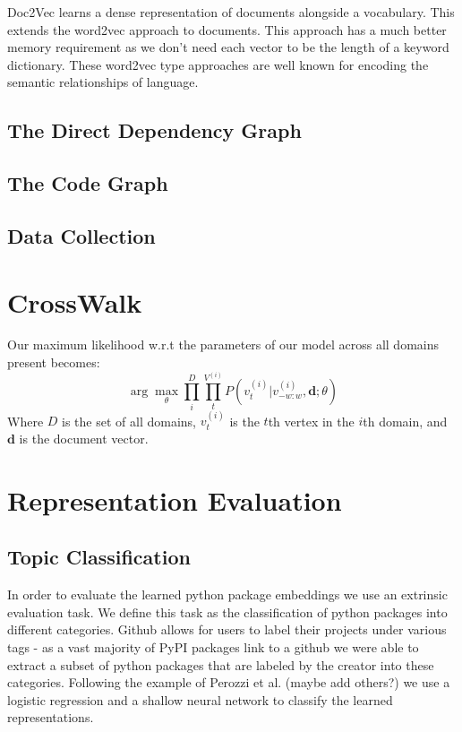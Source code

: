 \documentclass{article}
\begin{document}
 Doc2Vec \cite{doc2vec} learns a dense representation of documents alongside a vocabulary. This extends the word2vec \cite{word2vec} approach to documents. This approach has a much better memory requirement as we don’t need each vector to be the length of a keyword dictionary. These word2vec type approaches are well known for encoding the semantic relationships of language.

\subsection{The Direct Dependency Graph}

\subsection{The Code Graph}

\subsection{Data Collection}


\section{CrossWalk}
Our maximum likelihood w.r.t the parameters of our model across all domains present becomes:
\begin{equation}
\arg\max_{\theta} \prod_{i}^{D}\prod_{t}^{V^{(i)}}P(v^{(i)}_{t} | v^{(i)}_{-w:w}, \mathbf{d}; \theta)
\end{equation}
Where $D$ is the set of all domains, $v^{(i)}_{t}$ is the $t$th vertex in the $i$th domain, and $\mathbf{d}$ is the document vector.

\section{Representation Evaluation}

\subsection{Topic Classification}
In order to evaluate the learned python package embeddings we use an extrinsic evaluation task. We define this task as the classification of python packages into different categories. Github allows for users to label their projects under various tags - as a vast majority of PyPI packages link to a github we were able to extract a subset of python packages that are labeled by the creator into these categories. Following the example of Perozzi et al. (maybe add others?) we use a logistic regression and a shallow neural network to classify the learned representations.
\end{document}
